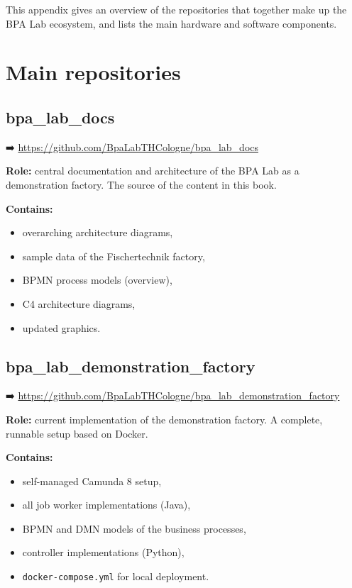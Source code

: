 \documentclass[
  english,
  11pt,
  a4paper,
]{scrbook}
\providecommand{\tightlist}{%
  \setlength{\itemsep}{0pt}\setlength{\parskip}{0pt}}
\begin{document}
This appendix gives an overview of the repositories that together make
up the BPA Lab ecosystem, and lists the main hardware and software
components.

\section{Main repositories}\label{main-repositories}

\subsection{bpa\_lab\_docs}\label{bpa_lab_docs}

➡️ \url{https://github.com/BpaLabTHCologne/bpa_lab_docs}

\textbf{Role:} central documentation and architecture of the BPA Lab as
a demonstration factory. The source of the content in this book.

\textbf{Contains:}

\begin{itemize}
\tightlist
\item
  overarching architecture diagrams,
\item
  sample data of the Fischertechnik factory,
\item
  BPMN process models (overview),
\item
  C4 architecture diagrams,
\item
  updated graphics.
\end{itemize}

\subsection{bpa\_lab\_demonstration\_factory}\label{bpa_lab_demonstration_factory}

➡️
\url{https://github.com/BpaLabTHCologne/bpa_lab_demonstration_factory}

\textbf{Role:} current implementation of the demonstration factory. A
complete, runnable setup based on Docker.

\textbf{Contains:}

\begin{itemize}
\tightlist
\item
  self-managed Camunda 8 setup,
\item
  all job worker implementations (Java),
\item
  BPMN and DMN models of the business processes,
\item
  controller implementations (Python),
\item
  \texttt{docker-compose.yml} for local deployment.
\end{itemize}
\end{document}
